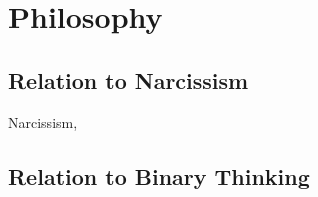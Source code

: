 \section{Philosophy}
\label{philosophy}

\subsection{Relation to Narcissism}
Narcissism, 

\subsection{Relation to Binary Thinking}

